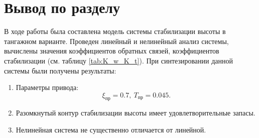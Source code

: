 \section{Вывод по разделу} 
В ходе работы была составлена модель системы стабилизации высоты в тангажном
варианте. Проведен линейный и нелинейный анализ системы, вычислены значения
коэффициентов обратных связей,
коэффициентов стабилизации (см. таблицу \ref{tab:K_w_K_t}). При синтезировании
данной системы были получены результаты:
\begin{enumerate}
    \item Параметры привода:
        \[
            \xi_{пр} = 0.7, \ T_{пр} = 0.045.
        \]
    \item Разомкнутый контур стабилизации высоты имеет удовлетворительные запасы.
    \item Нелинейная система не существенно отличается от линейной. 
\end{enumerate}

